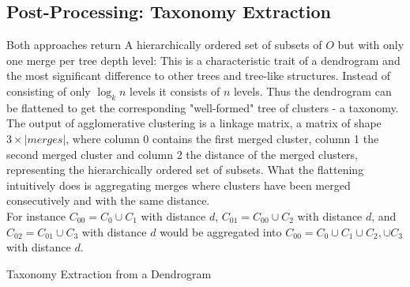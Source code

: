 \subsection{Post-Processing: Taxonomy Extraction}\label{\positionnumber}
Both approaches return A hierarchically ordered set of subsets of $O$ but with only one merge per tree depth level: This is a characteristic trait of a dendrogram and the most significant difference to other trees and tree-like structures. Instead of consisting of only $\log_k n$ levels it consists of $n$ levels. Thus the dendrogram can be flattened to get the corresponding "well-formed" tree of clusters - a taxonomy. \\
The output of agglomerative clustering is a linkage matrix, a matrix of shape $3 \times |merges|$, where column 0 contains the first merged cluster, column 1 the second merged cluster and column 2 the distance of the merged clusters, representing the hierarchically ordered set of subsets.
What the flattening intuitively does is aggregating merges where clusters have been merged consecutively and with the same distance. \\
For instance $C_{00} = C_0 \cup C_1$ with distance $d$, $C_{01} = C_{00} \cup C_2$ with distance $d$, and $C_{02} = C_{01} \cup C_3$ with distance $d$ would be aggregated into $C_{00} = C_0 \cup C_1 \cup C_2, \cup C_3$ with distance $d$. 
\begin{algorithm}[htp]
\caption{Taxonomy Extraction from a Dendrogram}\label{taxo}
\end{algorithm}

